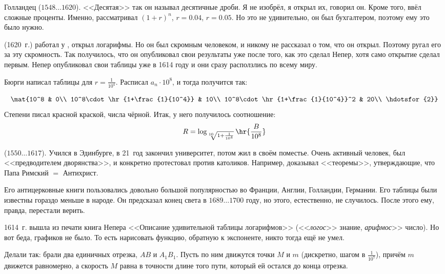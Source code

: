 \documentclass[a4paper,oneside,fleqn,10pt]{article}
\newcommand{\pe}[2]{${#1}\ldots{#2}$}
\begin{document}
Голландец 
(\pe{1548}{1620}). <<Десятая>> так он называл десятичные дроби. Я не
изобрёл, я открыл их, говорил он. Кроме того, ввёл сложные
проценты. Именно, рассматривал $(1+r)^n$, $r = 0.04$, $r = 0.05$.  Но
это не удивительно, он был бухгалтером, поэтому ему это было нужно.

 (1620~г.) работал у , открыл
логарифмы. Но он был скромным человеком, и никому не рассказал о том,
что он открыл. Поэтому  ругал его за эту скромность.  Так
получилось, что он опубликовал свои результаты уже после того, как это
сделал Непер, хотя само открытие сделал первым.  Непер опубликовал
свои таблицы уже в 1614 году и они сразу расползлись по всему миру.

Бюрги написал таблицы для $r = \frac{1}{10^4}$. Расписал $a_n\cdot
10^8$, и тогда получится так:

$$\mat{10^8 & 0\\ 10^8\cdot\hr{1+\frac{1}{10^4}} &
  10\\ 10^8\cdot\hr{1+\frac{1}{10^4}}^2 & 20\\ \hdotsfor{2}}$$ Степени
писал красной краской, числа чёрной.  Итак, у него получилось
соотношение:
$$R = \log_{\sqrt[10]{1+\frac{1}{10^4}}} \hr{\frac{B}{10^8}}$$

 (\pe{1550}{1617}).  Учился в Эдинбурге, в 21~год закончил
университет, потом жил в своём поместье.  Очень активный человек, был
<<предводителем дворянства>>, и конкретно протестовал против
католиков. Например, доказывал <<теоремы>>, утверждающие, что Папа
Римский $=$ Антихрист.

Его антицерковные книги пользовались довольно большой популярностью во
Франции, Англии, Голландии, Германии.  Его таблицы были известны
гораздо меньше в народе.  Он предсказал конец света в \pe{1689}{1700}
году, но этого, естественно, не случилось.  После этого ему, правда,
перестали верить.

1614~г. вышла из печати книга Непера <<Описание удивительной таблицы
логарифмов>> (<<\emph{логос}>> знание, \emph{арифмос}>> число).  Но
вот беда, графиков не было. То есть нарисовать функцию, обратную к
экспоненте, никто тогда ещё не умел.

Делали так: брали два единичных отрезка, $AB$ и $A_1B_1$.  Пусть по
ним движутся точки $M$ и $m$ (дискретно, шагом в $\frac{1}{10^7}$),
причём $m$ движется равномерно, а скорость $M$ равна в точности длине
того пути, который ей остался до конца отрезка.
\end{document}
